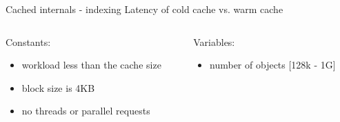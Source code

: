 \begin{frame}{Cached internals - indexing}
	Latency of cold cache vs. warm cache
	\begin{columns}[t]
		\begin{column}{.5\textwidth}
			Constants:
			\begin{itemize}
				\item workload less than the cache size
				\item block size is 4KB
				\item no threads or parallel requests 
			\end{itemize}
		\end{column}
		\begin{column}{.5\textwidth}
			Variables:
			\begin{itemize}
				\item number of objects [128k - 1G]
			\end{itemize}
		\end{column}
	\end{columns}
\end{frame}

